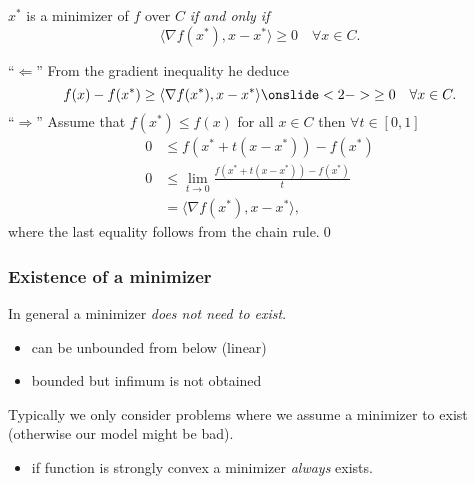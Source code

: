 \documentclass{beamer}
\begin{document}
\begin{frame}
  \begin{lemma}%
    $x^*$ is a minimizer of $f$ over $C$ \emph{if and only if}
    \begin{equation}
      \langle \nabla f(x^*), x-x^* \rangle \ge 0 \quad \forall x \in C.
    \end{equation}
  \end{lemma}
  ``$\Leftarrow$'' From the gradient inequality he deduce
  \begin{equation}
    f(x) - f(x^*) \ge \langle \nabla f(x^*), x-x^* \rangle \onslide<2->{\ge 0} \quad \forall x \in C.
  \end{equation}
  ``$\Rightarrow$'' Assume that $f(x^*)\le f(x)$ for all $x \in C$ then $\forall t \in [0, 1]$
  \begin{equation}
    \begin{aligned}
      0 &\le f(x^* + t(x-x^*)) - f(x^*) \\
      0 &\le \lim_{t\to 0} \frac{f(x^* + t(x-x^*)) - f(x^*)}{t} \\
        &= \langle \nabla f(x^*), x-x^* \rangle,
    \end{aligned}
  \end{equation}
  where the last equality follows from the chain rule.\qed

\end{frame}


\begin{frame}
  \frametitle{Existence of a minimizer}

  In general a minimizer \textit{does not need to exist}.
  \begin{itemize}
    \item can be unbounded from below (linear)
    \item bounded but infimum is not obtained
  \end{itemize}
  \begin{center}
  \end{center}

  Typically we only consider problems where we assume a minimizer to exist (otherwise our model might be bad).

  \begin{itemize}
    \item if function is strongly convex a minimizer \textit{always} exists.
  \end{itemize}

\end{frame}
\end{document}
